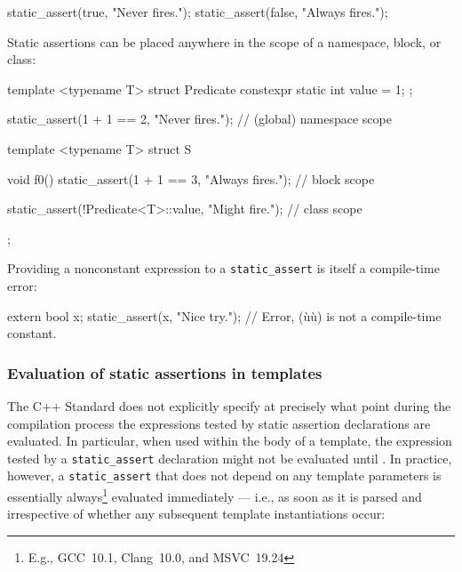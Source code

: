 \begin{emcppslisting}[emcppserrorlines=2]
static_assert(true, "Never fires.");
static_assert(false, "Always fires.");  
\end{emcppslisting}

\noindent Static assertions can be placed anywhere in the scope of a namespace,
block, or class:

\begin{emcppshiddenlisting}[emcppsbatch=e1]
template <typename T> struct Predicate
{
   constexpr static int value = 1;
};
\end{emcppshiddenlisting}
\begin{emcppslisting}[emcppsbatch=e1,emcppserrorlines=8]
static_assert(1 + 1 == 2, "Never fires.");  // (global) namespace scope

template <typename T>
struct S
{
    void f0()
    {
        static_assert(1 + 1 == 3, "Always fires.");  // block scope
    }

    static_assert(!Predicate<T>::value, "Might fire.");  // class scope
};
\end{emcppslisting}

\noindent Providing a nonconstant expression to a \lstinline!static_assert! is
itself a compile-time error:

\begin{emcppslisting}
extern bool x;
static_assert(x, "Nice try.");  // Error, (ù{}ù) is not a compile-time constant.
\end{emcppslisting}


\subsubsection[Evaluation of static assertions in templates]{Evaluation of static assertions in templates}\label{evaluation-of-static-assertions-in-templates}

The C++ Standard does not explicitly specify at precisely what point during
the compilation process the expressions tested by static assertion declarations are
evaluated. In particular, when used within the body of a template, the expression tested by a
\lstinline!static_assert! declaration might not be evaluated until
. In practice, however, a
\lstinline!static_assert! that does not depend on any template parameters
is essentially always{\cprotect\footnote{E.g.,
GCC~10.1, Clang~10.0, and MSVC~19.24}} evaluated immediately --- i.e., as
soon as it is parsed and irrespective of whether any subsequent template
instantiations occur:

